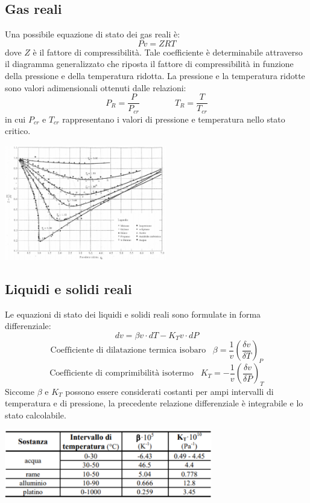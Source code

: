 \subsection{Gas reali}
Una possibile equazione di stato dei gas reali è:
\[
    Pv = ZRT
\]
dove $Z$ è il fattore di compressibilità. Tale coefficiente è determinabile attraverso il diagramma generalizzato che riposta il fattore di compressibilità in funzione della pressione e della temperatura ridotta. La pressione e la temperatura ridotte sono valori adimensionali ottenuti dalle relazioni:
\[
    P_R = \frac{P}{P_{cr}} \;\;\;\;\;\;\;\;\;\;\;\;\;\;\;T_R = \frac{T}{T_{cr}}
\]
in cui $P_{cr}$ e $T_{cr}$ rappresentano i valori di pressione e temperatura nello stato critico.
\begin{center}
    \includegraphics[height=5cm]{../NOTE SUGLI ESERCIZI/img2.PNG}
\end{center}
\subsection{Liquidi e solidi reali}
Le equazioni di stato dei liquidi e solidi reali sono formulate in forma differenziale:
\[
    dv = \beta v \cdot dT - K_Tv \cdot  dP
\]
\[
    \text{Coefficiente di dilatazione termica isobaro}\;\;\;\beta = \frac{1}{v} \left(\frac{\delta v}{\delta T}\right)_P
\]
\[
    \text{Coefficiente di comprimibilità isotermo}\;\;\;K_T = - \frac{1}{v} \left(\frac{\delta v}{\delta P}\right)_T
\]
Siccome $\beta$ e $K_T$ possono essere considerati costanti per ampi intervalli di temperatura e di pressione, la precedente relazione differenziale è integrabile e lo stato calcolabile.
\begin{center}
    \includegraphics[height=3cm]{../NOTE SUGLI ESERCIZI/img3.PNG}
\end{center}
